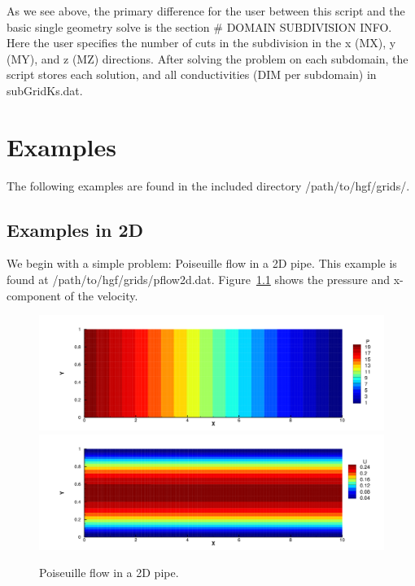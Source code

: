 \documentclass{report}
\begin{document}
\noindent As we see above, the primary difference for the user between this
script and the basic single geometry solve is the section \# DOMAIN SUBDIVISION INFO.
Here the user specifies the number of cuts in the subdivision in the x (MX), y (MY),
and z (MZ) directions. After solving the problem on each subdomain, the script
stores each solution, and all conductivities (DIM per subdomain) in subGridKs.dat.

\chapter{Examples}

\noindent The following examples are found in the included directory /path/to/hgf/grids/.\\

\section{Examples in 2D}

\noindent We begin with a simple problem: Poiseuille flow in a 2D pipe. This
example is found at /path/to/hgf/grids/pflow2d.dat. Figure~\ref{fig:2dpflow}
shows the pressure and x-component of the velocity.\\
\begin{figure}
  \centering
  \includegraphics[width=.9\textwidth]{images/pflow2dP.png}\\
  \includegraphics[width=.9\textwidth]{images/pflow2dU.png}
  \caption{\label{fig:2dpflow}Poiseuille flow in a 2D pipe.}
\end{figure}
\end{document}
